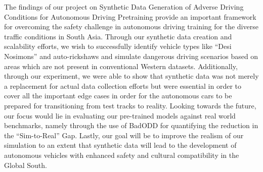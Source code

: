 


The findings of our project on Synthetic Data Generation of Adverse Driving Conditions for Autonomous Driving Pretraining provide an important framework for overcoming the safety challenge in autonomous driving training for the diverse traffic conditions in
South Asia. Through our synthetic data creation and scalability efforts, we wish to successfully identify vehicle types like “Desi Nosimons” and auto-rickshaws and simulate dangerous driving scenarios based on areas which are not present in conventional Western datasets. Additionally, through our experiment, we were able to show that synthetic data was not merely a replacement for actual data collection efforts but were essential in order to cover all the important edge cases in order for the autonomous cars to be prepared for transitioning from test tracks to reality.
Looking towards the future, our focus would lie in evaluating our pre-trained models against real world benchmarks, namely through the use of BadODD for quantifying the reduction in the “Sim-to-Real” Gap. Lastly, our goal will be to improve the realism of our simulation to an extent that synthetic data will lead to the development of autonomous vehicles with enhanced safety and cultural compatibility in the Global South.
